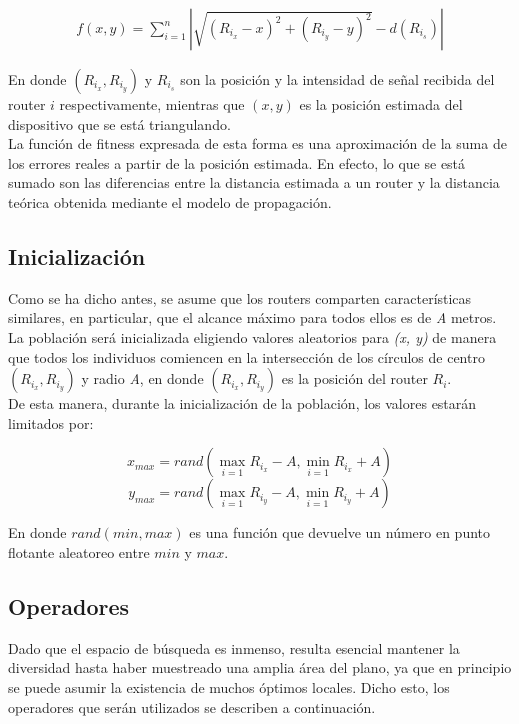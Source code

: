 \documentclass[journal]{IEEEtran}
\begin{document}
\begin{equation*}
\begin{split}
f(x, y) = \sum_{i=1}^{n} |\sqrt{(R_{i_x}-x)^2 + (R_{i_y}-y)^2} - d(R_{i_s})|
\end{split}
\end{equation*}

En donde $(R_{i_x},R_{i_y})$ y $R_{i_s}$ son la posición y la intensidad de señal recibida del router $i$ respectivamente, mientras que $(x,y)$ es la posición estimada del dispositivo que se está triangulando.\\

La función de fitness expresada de esta forma es una aproximación de la suma de los errores reales a partir de la posición estimada. En efecto, lo que se está sumado son las diferencias entre la distancia estimada a un router y la distancia teórica obtenida mediante el modelo de propagación.\\

\subsection{Inicialización}

Como se ha dicho antes, se asume que los routers comparten características similares, en particular, que el alcance máximo para todos ellos es de \textit{A} metros.\\

La población será inicializada eligiendo valores aleatorios para \textit{(x, y)} de manera que todos los individuos comiencen  en la intersección de los círculos de centro $(R_{i_x}, R_{i_y})$ y radio \textit{A}, en donde $(R_{i_x}, R_{i_y})$ es la posición del router $R_i$.\\

De esta manera, durante la inicialización de la población, los valores estarán limitados por:

$$x_{max} = rand(\max_{i=1} {R_{i_x} - A}, \min_{i=1} {R_{i_x} + A})$$
$$y_{max} = rand(\max_{i=1} {R_{i_y} - A}, \min_{i=1} {R_{i_y} + A})$$

En donde $rand(min, max)$ es una función que devuelve un número en punto flotante aleatoreo entre $min$ y $max$.

\subsection{Operadores}

Dado que el espacio de búsqueda es inmenso, resulta esencial mantener la diversidad hasta haber muestreado una amplia área del plano, ya que en principio se puede asumir la existencia de muchos óptimos locales. Dicho esto, los operadores que serán utilizados se describen a continuación.\\
\end{document}
